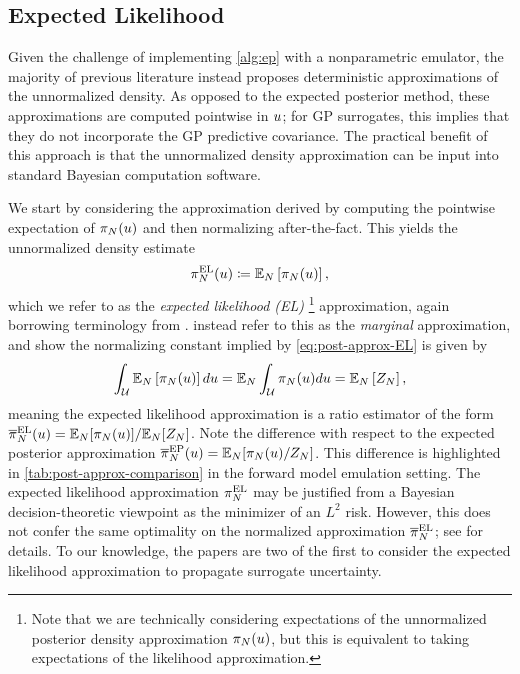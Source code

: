 \documentclass[12pt]{article}
\begin{document}
\subsection{Expected Likelihood}
Given the challenge of implementing \cref{alg:ep} with a nonparametric emulator, the majority of 
previous literature instead proposes deterministic approximations of the unnormalized
density. As opposed to the expected posterior method, these approximations are computed 
pointwise in $\Par$; for GP surrogates, this implies that they do not incorporate the GP 
predictive covariance. The practical benefit of this approach is that the unnormalized density 
approximation can be input into standard Bayesian computation software.

We start by considering the approximation derived by computing the pointwise expectation 
of $\postEm(\Par)$ and then normalizing after-the-fact.
This yields the unnormalized density estimate
\begin{align}
\postApproxMarg[\Ndesign](\Par) \Def \E_{\Ndesign}\left[\postEm[\Ndesign](\Par) \right], \label{eq:post-approx-EL}
\end{align}
which we refer to as the \textit{expected likelihood (EL)}
\footnote{Note that we are technically considering expectations of the unnormalized posterior density approximation 
$\postEm[\Ndesign](\Par)$, but this is equivalent to taking expectations of the likelihood approximation.}
approximation, again borrowing terminology from
 \citet{BurknerSurrogate}. \citet{StuartTeck1} instead refer to this as the \textit{marginal} approximation, 
 and show the normalizing constant implied by \cref{eq:post-approx-EL} is given by
 \begin{equation}
 \int_{\parSpace} \E_{\Ndesign}\left[\postEm[\Ndesign](\Par) \right] d\Par 
 = \E_{\Ndesign} \int_{\parSpace} \postEm[\Ndesign](\Par) d\Par
 = \E_{\Ndesign}\left[\normCstEm \right],
 \end{equation} 
meaning the expected likelihood approximation is a ratio estimator of the form 
 $\postApproxNormMarg[\Ndesign](\Par) = \E_{\Ndesign}[\postEm[\Ndesign](\Par)] / \E_{\Ndesign}[\normCstEm]$.
 Note the difference with respect to the expected posterior approximation 
 $\postApproxEP[\Ndesign](\Par) = \E_{\Ndesign}[\postEm[\Ndesign](\Par) / \normCstEm]$.
 This difference is highlighted in \cref{tab:post-approx-comparison} in the forward model emulation setting. 
 The expected likelihood approximation $\postApproxMarg[\Ndesign]$ may be justified from a Bayesian
 decision-theoretic viewpoint as the minimizer of an $L^2$ risk. However, this does not 
 confer the same optimality on the normalized approximation $\postApproxNormMarg[\Ndesign]$;
 see \citep{SinsbeckNowak,StuartTeck2,VehtariParallelGP} for details. To our knowledge, the papers
 \citep{SinsbeckNowak,StuartTeck1} are two of the first to consider the expected likelihood approximation
 to propagate surrogate uncertainty.
 
\end{document}
